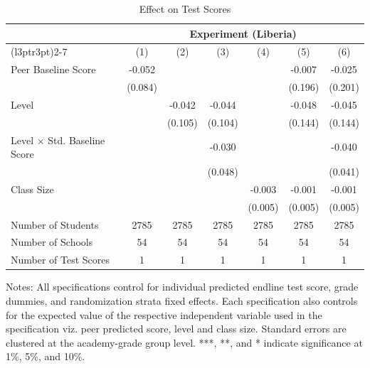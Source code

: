 \begin{table}[!h]
\centering\centering\centering
\caption{Effect on Test Scores}
\centering
\begin{threeparttable}
\fontsize{10}{12}\selectfont
\begin{tabular}[t]{lcccccc}
\toprule
\multicolumn{1}{c}{ } & \multicolumn{6}{c}{Experiment (Liberia)} \\
\cmidrule(l{3pt}r{3pt}){2-7}
  & (1) & (2) & (3) & (4) & (5) & (6)\\
\midrule
Peer Baseline Score & -0.052 &  &  &  & -0.007 & -0.025\\
 & (0.084) &  &  &  & (0.196) & (0.201)\\
Level &  & -0.042 & -0.044 &  & -0.048 & -0.045\\
 &  & (0.105) & (0.104) &  & (0.144) & (0.144)\\
Level $\times$ Std. Baseline Score &  &  & -0.030 &  &  & -0.040\\
 &  &  & (0.048) &  &  & (0.041)\\
Class Size &  &  &  & -0.003 & -0.001 & -0.001\\
 &  &  &  & (0.005) & (0.005) & (0.005)\\
\hline
\midrule
Number of Students & 2785 & 2785 & 2785 & 2785 & 2785 & 2785\\
Number of Schools & 54 & 54 & 54 & 54 & 54 & 54\\
Number of Test Scores & 1 & 1 & 1 & 1 & 1 & 1\\
\bottomrule
\end{tabular}
\begin{tablenotes}[para]
\item Notes: All specifications control for individual predicted endline test score, 
           grade dummies, and randomization strata fixed effects. Each specification also controls for the    
           expected value of the respective independent variable used in the specification viz. peer predicted              score, level and class size. Standard errors are clustered at the academy-grade group level. ***, **,            and * indicate significance at 1\%, 5\%, and 10\%.
\end{tablenotes}
\end{threeparttable}
\end{table}
